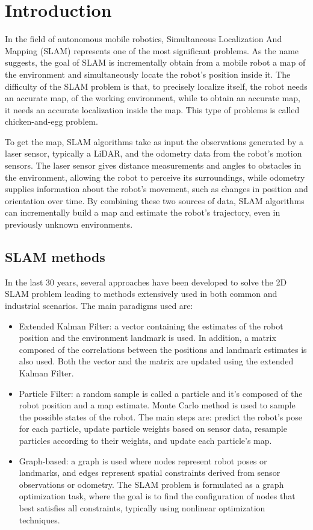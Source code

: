 \section{Introduction}
In the field of autonomous mobile robotics, Simultaneous Localization And Mapping (SLAM) represents
one of the most significant problems. As the name suggests, the goal of SLAM is incrementally obtain 
from a mobile robot a map of the environment and simultaneously locate the robot's position inside it.
The difficulty of the SLAM problem is that, to precisely localize itself, the robot needs an accurate map,
of the working environment, while to obtain an accurate map, it needs an accurate localization inside the
map. This type of problems is called chicken-and-egg problem.

To get the map, SLAM algorithms take as input the observations generated by a laser sensor, typically a LiDAR, and
the odometry data from the robot's motion sensors. The laser sensor gives distance measurements and angles to
obstacles in the environment, allowing the robot to perceive its surroundings, while odometry supplies information
about the robot's movement, such as changes in position and orientation over time. By combining these two sources
of data, SLAM algorithms can incrementally build a map and estimate the robot's trajectory, even in previously 
unknown environments.

\subsection{SLAM methods}
In the last 30 years, several approaches have been developed to solve the 2D SLAM problem leading to methods 
extensively used in both common and industrial scenarios. The main paradigms \cite{Stachniss2016} used are:
\begin{itemize}
    \item Extended Kalman Filter: a vector containing the estimates of the robot position and the environment 
    landmark is used. In addition, a matrix composed of the correlations between the positions and landmark
    estimates is also used. Both the vector and the matrix are updated using the extended Kalman Filter.
    \item Particle Filter: a random sample is called a particle and it's composed of the robot position and a map
    estimate. Monte Carlo method is used to sample the possible states of the robot. The main 
    steps are: predict the robot’s pose for each particle, update particle weights based on sensor data,
    resample particles according to their weights, and update each particle’s map.
    \item Graph-based: a graph is used where nodes represent robot poses or landmarks, and edges represent
    spatial constraints derived from sensor observations or odometry. The SLAM problem is formulated as a 
    graph optimization task, where the goal is to find the configuration of nodes that best satisfies all 
    constraints, typically using nonlinear optimization techniques.
\end{itemize}

